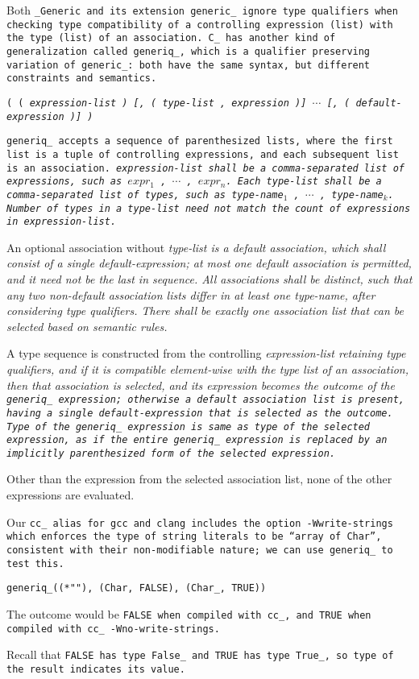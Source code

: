 Both \tt{_Generic} and its extension \tt{generic_} ignore type
qualifiers when checking type compatibility of a controlling
expression (list) with the type (list) of an association.
C\_ has another kind of generalization called \tt{generiq_},
which is a qualifier preserving variation of  \tt{generic_}:
both have the same syntax, but different constraints and semantics.


 \tt{( (} \it{expression-list} \tt{)}
[\tt{, (} \it{type-list} \tt{,} \it{expression} \tt{)}] $\cdots$
[\tt{, (} \it{default-expression} \tt{)}]
\tt{)}


\tt{generiq_} accepts a sequence of parenthesized lists, where the first list is
a tuple of controlling expressions, and each subsequent list is an association.
\it{expression-list} shall be a comma-separated list of expressions,
such as $expr_1$ \tt{,} $\cdots$ \tt{,} $expr_n$.
Each \it{type-list} shall be a comma-separated list of types,
such as \it{type-name}$_1$ \tt{,} $\cdots$ \tt{,} \it{type-name}$_k$.
Number of types in a \it{type-list} need not match
the count of expressions in \it{expression-list}.

An optional association without \it{type-list} is a default association,
which shall consist of a single \it{default-expression}; at most one
default association is permitted, and it need not be the last in sequence.
All associations shall be distinct, such that any two non-default association
lists differ in at least one \it{type-name}, after considering type qualifiers.
There shall be exactly one association list
that can be selected based on semantic rules.


A type sequence is constructed from the controlling \it{expression-list}
retaining type qualifiers, and if it is compatible element-wise with
the type list of an association, then that association is selected,
and its expression becomes the outcome of the \tt{generiq_} expression;
otherwise a default association list is present,
having a single \it{default-expression} that is selected as the outcome.
Type of the \tt{generiq_} expression is same as type of the selected expression,
as if the entire \tt{generiq_} expression is replaced by an
implicitly parenthesized form of the selected expression.

Other than the expression from the selected association list,
none of the other expressions are evaluated.

\example Our \tt{cc_} alias for \tt{gcc} and \tt{clang} includes the option
\tt{-Wwrite-strings} which enforces the type of string literals to be
``array of \tt{Char}'', consistent with their non-modifiable nature;
we can use \tt{generiq_} to test this.

\centerline{\tt{generiq_((*""), (Char, FALSE), (Char_, TRUE))}}

The outcome would be \tt{FALSE} when compiled with \tt{cc_},
and \tt{TRUE} when compiled with \tt{cc_ -Wno-write-strings}.

\note Recall that \tt{FALSE} has type \tt{False_} and \tt{TRUE}
has type \tt{True_}, so type of the result indicates its value.
